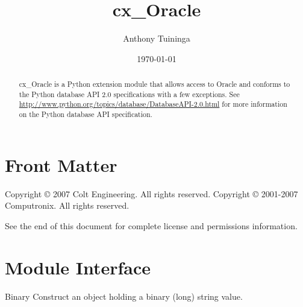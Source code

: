 \documentclass{manual}
\title{cx\_Oracle}
\author{Anthony Tuininga}
\date{\today}                   %
\begin{document}
\maketitle

\ifhtml
\chapter*{Front Matter\label{front}}
\fi

Copyright \copyright{} 2007 Colt Engineering. All rights reserved.\break
Copyright \copyright{} 2001-2007 Computronix. All rights reserved.

See the end of this document for complete license and permissions
information.

\begin{abstract}

\noindent
cx_Oracle is a Python extension module that allows access to Oracle and
conforms to the Python database API 2.0 specifications with a few exceptions.
See \url{http://www.python.org/topics/database/DatabaseAPI-2.0.html} for more
information on the Python database API specification.

\end{abstract}

\tableofcontents

\chapter{Module Interface\label{module}}

\begin{funcdesc}{Binary}{}
  Construct an object holding a binary (long) string value.
\end{funcdesc}
\end{document}
